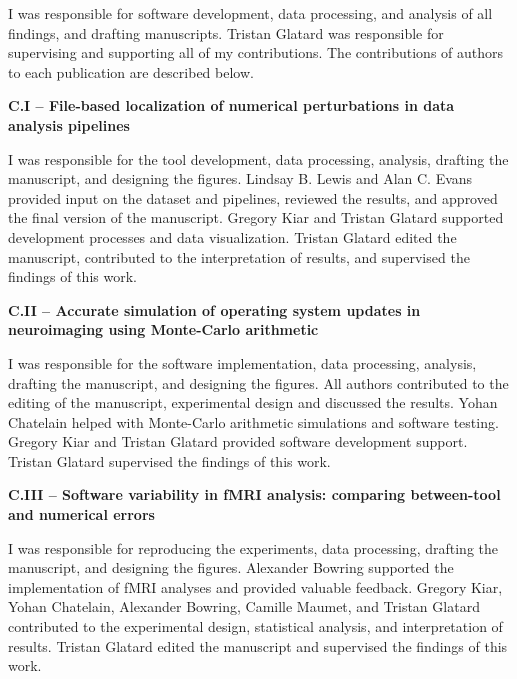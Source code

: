 \begin{authorcontributions}

I was responsible for software development, data processing, and analysis of all findings, and drafting manuscripts. 
Tristan Glatard was responsible for supervising and supporting all of my contributions.
The contributions of authors to each publication are described below.

\textbf{C.I – File-based localization of numerical perturbations in data analysis pipelines~\cite{salari2020spot}}

I was responsible for the tool development, data processing, analysis, drafting the manuscript, and designing the figures.
Lindsay B. Lewis and Alan C. Evans provided input on the dataset and pipelines, reviewed the results, and approved the final version of the manuscript.
Gregory Kiar and Tristan Glatard supported development processes and data visualization.
Tristan Glatard edited the manuscript, contributed to the interpretation of results, and supervised the findings of this work.

\textbf{C.II – Accurate simulation of operating system updates in neuroimaging using Monte-Carlo arithmetic~\cite{salari2021accurate}}

I was responsible for the software implementation, data processing, analysis, drafting the manuscript, and designing the figures.
All authors contributed to the editing of the manuscript, experimental design and discussed the results.
Yohan Chatelain helped with Monte-Carlo arithmetic simulations and software testing.
Gregory Kiar and Tristan Glatard provided software development support.
Tristan Glatard supervised the findings of this work.

\textbf{C.III – Software variability in fMRI analysis: comparing between-tool and numerical errors}

I was responsible for reproducing the experiments, data processing, drafting the manuscript, and designing the figures.
Alexander Bowring supported the implementation of fMRI analyses and provided valuable feedback.
Gregory Kiar, Yohan Chatelain, Alexander Bowring, Camille Maumet, and Tristan Glatard contributed to
the experimental design, statistical analysis, and interpretation of results.
Tristan Glatard edited the manuscript and supervised the findings of this work.

\end{authorcontributions}